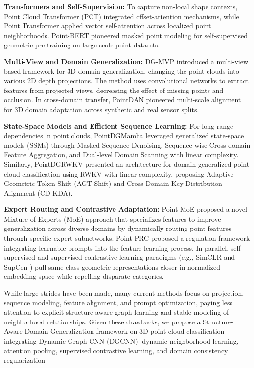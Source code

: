 \documentclass[conference]{IEEEtran}
\begin{document}
\textbf{Transformers and Self-Supervision:} To capture non-local shape contexts, Point Cloud Transformer (PCT) \cite{guo2021pct} integrated offset-attention mechanisms, while Point Transformer \cite{zhao2021pointtransformer} applied vector self-attention across localized point neighborhoods. Point-BERT \cite{yu2022pointbert} pioneered masked point modeling for self-supervised geometric pre-training on large-scale point datasets.

\textbf{Multi-View and Domain Generalization:} DG-MVP \cite{ren2025dgmvp} introduced a multi-view based framework for 3D domain generalization, changing the point clouds into various 2D depth projections. The method uses convolutional networks to extract features from projected views, decreasing the effect of missing points and occlusion. In cross-domain transfer, PointDAN \cite{qin2019pointdan} pioneered multi-scale alignment for 3D domain adaptation across synthetic and real sensor splits.

\textbf{State-Space Models and Efficient Sequence Learning:} For long-range dependencies in point clouds, PointDGMamba \cite{yang2025pointdgmamba} leveraged generalized state-space models (SSMs) through Masked Sequence Denoising, Sequence-wise Cross-domain Feature Aggregation, and Dual-level Domain Scanning with linear complexity. Similarly, PointDGRWKV \cite{yang2025pointdgrwkv} presented an architecture for domain generalized point cloud classification using RWKV with linear complexity, proposing Adaptive Geometric Token Shift (AGT-Shift) and Cross-Domain Key Distribution Alignment (CD-KDA).

\textbf{Expert Routing and Contrastive Adaptation:} Point-MoE \cite{chen2025pointmoe} proposed a novel Mixture-of-Experts (MoE) approach that specializes features to improve generalization across diverse domains by dynamically routing point features through specific expert subnetworks. Point-PRC \cite{sun2024pointprc} proposed a regulation framework integrating learnable prompts into the feature learning process. In parallel, self-supervised and supervised contrastive learning paradigms (e.g., SimCLR \cite{chen2020simclr} and SupCon \cite{khosla2020supervised}) pull same-class geometric representations closer in normalized embedding space while repelling disparate categories.

While large strides have been made, many current methods focus on projection, sequence modeling, feature alignment, and prompt optimization, paying less attention to explicit structure-aware graph learning and stable modeling of neighborhood relationships. Given these drawbacks, we propose a Structure-Aware Domain Generalization framework on 3D point cloud classification integrating Dynamic Graph CNN (DGCNN), dynamic neighborhood learning, attention pooling, supervised contrastive learning, and domain consistency regularization.
\end{document}
